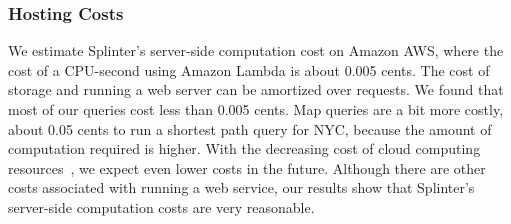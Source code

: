 %

\subsubsection{Hosting Costs}
\label{sec:pricing}
We estimate Splinter's server-side computation cost on Amazon AWS, 
where the cost of a CPU-second using Amazon Lambda is about 0.005 cents. 
The cost of storage and running a web server can be amortized over requests.
We found that most of our queries cost less than 0.005 cents. Map queries are a bit more costly,
about 0.05 cents to run a shortest path query for NYC, because the amount of 
computation required is higher. With the decreasing cost of cloud computing resources~\cite{decrease-aws},
we expect even lower costs in the future. Although there are other costs associated with running a web service,
our results show that Splinter's server-side computation costs are very reasonable.


